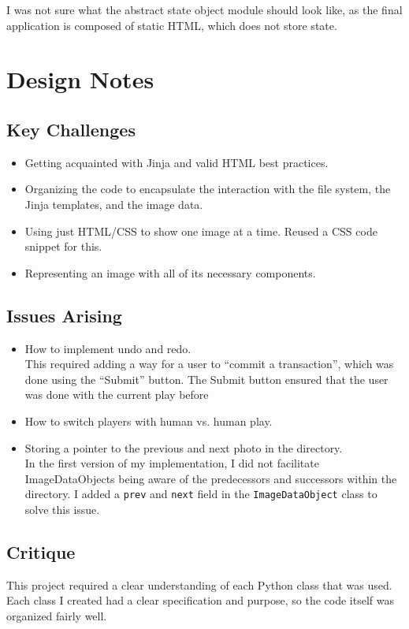 \documentclass[11pt,letterpaper]{article}
\begin{document}
I was not sure what the abstract state object module should look like, as the final application is composed of static HTML, which does not store state.

\section{Design Notes} %
\subsection{Key Challenges}
\begin{itemize}
\item Getting acquainted with Jinja and valid HTML best practices. 
\item Organizing the code to encapsulate the interaction with the file system, the Jinja templates, and the image data.
\item Using just HTML/CSS to show one image at a time. Reused a CSS code snippet for this.
\item Representing an image with all of its necessary components.
\end{itemize}

\subsection{Issues Arising}
\begin{itemize}
\item How to implement undo and redo.\\
This required adding a way for a user to ``commit a transaction'', which was done using the ``Submit'' button. The Submit button ensured that the user was done with the current play before 
\item How to switch players with human vs. human play.\\

\item Storing a pointer to the previous and next photo in the directory.\\
In the first version of my implementation, I did not facilitate ImageDataObjects being aware of the predecessors and successors within the directory. I added a \texttt{prev} and \texttt{next} field in the \texttt{ImageDataObject} class to solve this issue.
\end{itemize}

\subsection{Critique}
This project required a clear understanding of each Python class that was used. Each class I created had a clear specification and purpose, so the code itself was organized fairly well.
\end{document}
